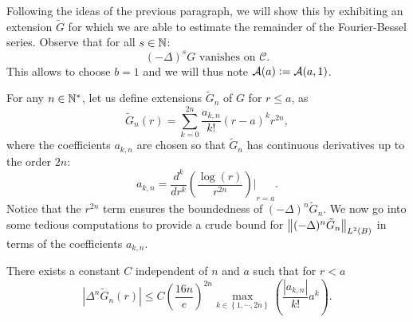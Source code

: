 \documentclass[11pt,a4paper]{article}
\begin{document}
Following the ideas of the previous paragraph, we will show this by exhibiting an extension $\tilde{G}$ for which we are able to estimate the remainder of the Fourier-Bessel series. Observe that for all $s \in \mathbb{N}$:
\[(-\Delta)^s G \text{ vanishes on } \mathcal{C}.\]
This allows to choose $b=1$ and we will thus note $\mathcal{A}(a) \mathrel{\mathop:}= \mathcal{A}(a,1)$. 

For any $n \in \mathbb{N}^{*}$, let us define extensions $\tilde{G}_n$ of $G$ for $r \leq a$, as
\[\tilde{G}_n(r) = \sum_{k=0}^{2n} \dfrac{a_{k,n}}{k!}(r-a)^k r^{2n},\]
where the coefficients $a_{k,n}$ are chosen so that $\tilde{G}_n$ has continuous derivatives up to the order $2n$:
\[a_{k,n} = {\dfrac{d^k}{dr^k}\left(\dfrac{\log(r)}{r^{2n}}\right)\bigg|}_{r=a}.\]
Notice that the $r^{2n}$ term ensures the boundedness of $(-\Delta)^n \tilde{G}_n$. We now go into some tedious computations to provide a crude bound for $\left\|(-\Delta)^n \tilde{G}_n\right\|_{L^2(B)}$ in terms of the coefficients $a_{k,n}$.

\begin{Lem} 
	\label{LemmeDegueu}
	There exists a constant $C$ independent of $n$ and $a$ such that for $r<a$
	\begin{equation}
		\left|\Delta^n \tilde{G}_n(r)\right| \leq  C \left( \frac{16n}{e}\right)^{2n}\!\!\!\!\!\max_{k\in \left\{1,\cdots,2n\right\}}\left(\dfrac{|a_{k,n}|}{k!}a^k\right).
		\label{bigBadEq1Reduced}
	\end{equation}
	\label{LemAkDeltanf}
\end{Lem}
\end{document}
